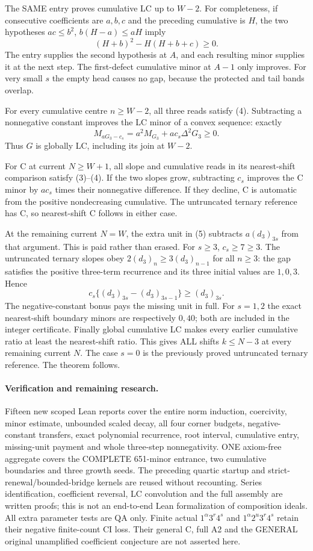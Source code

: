 The SAME entry proves cumulative LC up to $W-2$. For completeness,
if consecutive coefficients are $a,b,c$ and the preceding cumulative
is $H$, the two hypotheses
$ac\le b^2$, $b(H-a)\le aH$ imply
\[
                  (H+b)^2-H(H+b+c)\ge0.
\]
The entry supplies the second hypothesis at $A$, and each resulting
minor supplies it at the next step. The first-defect cumulative minor
at $A-1$ only improves. For very small $s$ the empty head causes no
gap, because the protected and tail bands overlap.

For every cumulative centre $n\ge W-2$, all three reads satisfy (4).
Subtracting a nonnegative constant improves the LC minor of a convex
sequence: exactly
\[
 M_{aG_3-c_s}=a^2M_{G_3}+a c_s\Delta^2G_3\ge0.
\]
Thus $G$ is globally LC, including its join at $W-2$.

For C at current $N\ge W+1$, all slope and cumulative reads in its
nearest-shift comparison satisfy (3)--(4). If the two slopes grow,
subtracting $c_s$ improves the C minor by $a c_s$ times their
nonnegative difference. If they decline, C is automatic from the
positive nondecreasing cumulative. The untruncated ternary reference
has C, so nearest-shift C follows in either case.

At the remaining current $N=W$, the extra unit in (5) subtracts
$a(d_3)_{3s}$ from that argument. This is paid rather than erased.
For $s\ge3$, $c_s\ge7\ge3$. The untruncated ternary slopes obey
$2(d_3)_n\ge3(d_3)_{n-1}$ for all $n\ge3$: the gap satisfies the
positive three-term recurrence and its three initial values are
$1,0,3$. Hence
\[
 c_s\{(d_3)_{3s}-(d_3)_{3s-1}\}\ge(d_3)_{3s}.
\]
The negative-constant bonus pays the missing unit in full. For
$s=1,2$ the exact nearest-shift boundary minors are respectively
$0,40$; both are included in the integer certificate.
Finally global cumulative LC makes every earlier cumulative ratio
at least the nearest-shift ratio. This gives ALL shifts $k\le N-3$
at every remaining current $N$. The case $s=0$ is the previously
proved untruncated ternary reference. The theorem follows.

\paragraph{Verification and remaining research.}
Fifteen new scoped Lean reports cover the entire norm induction,
coercivity, minor estimate, unbounded scaled decay, all four corner
budgets, negative-constant transfers, exact polynomial recurrence,
root interval, cumulative entry, missing-unit payment and whole
three-step nonnegativity. ONE axiom-free aggregate covers the COMPLETE
651-minor entrance, two cumulative boundaries and three growth seeds.
The preceding quartic startup and strict-renewal/bounded-bridge kernels
are reused without recounting. Series identification, coefficient
reversal, LC convolution and the full assembly are written proofs;
this is not an end-to-end Lean formalization of composition ideals.
All extra parameter tests are QA only.
Finite actual $1^\alpha3^r4^s$ and $1^\alpha2^u3^r4^s$ retain their
negative finite-count CI loss. Their general C, full A2 and the GENERAL
original unamplified coefficient conjecture are not asserted here.
